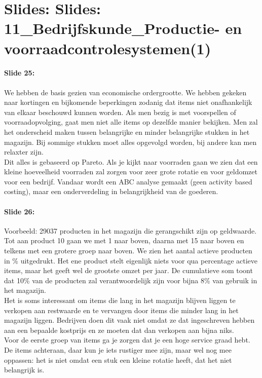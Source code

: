 \documentclass[10pt,a4paper]{report}
\begin{document}
\section{Slides: Slides: 11\_Bedrijfskunde\_Productie- en voorraadcontrolesystemen(1)}

\paragraph{Slide 25:} We hebben de basis gezien van economische ordergrootte. We hebben gekeken naar kortingen en bijkomende beperkingen zodanig dat items niet onafhankelijk van elkaar beschouwd kunnen worden. Als men bezig is met voorspellen of voorraadopvolging, gaat men niet alle items op dezelfde manier bekijken. Men zal het onderscheid maken tussen belangrijke en minder belangrijke stukken in het magazijn. Bij sommige stukken moet alles opgevolgd worden, bij andere kan men relaxter zijn.\\
Dit alles is gebaseerd op Pareto. Als je kijkt naar voorraden gaan we zien dat een kleine hoeveelheid voorraden zal zorgen voor zeer grote rotatie en voor geldomzet voor een bedrijf. Vandaar wordt een ABC analyse gemaakt (geen activity based costing), maar een onderverdeling in belangrijkheid van de goederen.
\paragraph{Slide 26:} Voorbeeld: 29037 producten in het magazijn die gerangschikt zijn op geldwaarde. Tot aan product 10 gaan we met 1 naar boven, daarna met 15 naar boven en telkens met een grotere groep naar boven. We zien het aantal actieve producten in \% uitgedrukt. Het ene product stelt eigenlijk niets voor qua percentage actieve items, maar het geeft wel de grootste omzet per jaar. De cumulatieve som toont dat 10\% van de producten zal verantwoordelijk zijn voor bijna 8\% van gebruik in het magazijn. \\
Het is soms interessant om items die lang in het magazijn blijven liggen te verkopen aan restwaarde en te vervangen door items die minder lang in het magazijn liggen. Bedrijven doen dit vaak niet omdat ze dat ingeschreven hebben aan een bepaalde kostprijs en ze moeten dat dan verkopen aan bijna niks.\\
Voor de eerste groep van items ga je zorgen dat je een hoge service graad hebt. De items achteraan, daar kun je iets rustiger mee zijn, maar wel nog mee oppassen: het is niet omdat een stuk een kleine rotatie heeft, dat het niet belangrijk is.
\end{document}
